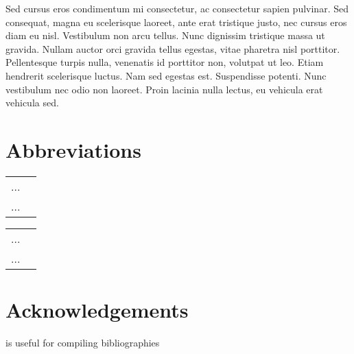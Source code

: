\documentclass[output=paper,colorlinks,citecolor=brown,
]{langscibook}
\begin{document}
Sed cursus eros condimentum mi consectetur, ac consectetur sapien pulvinar. Sed consequat, magna eu scelerisque laoreet, ante erat tristique justo, nec cursus eros diam eu nisl. Vestibulum non arcu tellus. Nunc dignissim tristique massa ut gravida. Nullam auctor orci gravida tellus egestas, vitae pharetra nisl porttitor. Pellentesque turpis nulla, venenatis id porttitor non, volutpat ut leo. Etiam hendrerit scelerisque luctus. Nam sed egestas est. Suspendisse potenti. Nunc vestibulum nec odio non laoreet. Proin lacinia nulla lectus, eu vehicula erat vehicula sed.


\section*{Abbreviations}
\begin{tabularx}{.5\textwidth}{@{}lQ@{}}
... & \\
... & \\
\end{tabularx}%
\begin{tabularx}{.5\textwidth}{@{}lQ@{}}
... & \\
... & \\
\end{tabularx}

\section*{Acknowledgements}
\citet{Nordhoff2018} is useful for compiling bibliographies
\printbibliography[heading=subbibliography,notkeyword=this]
\end{document}
